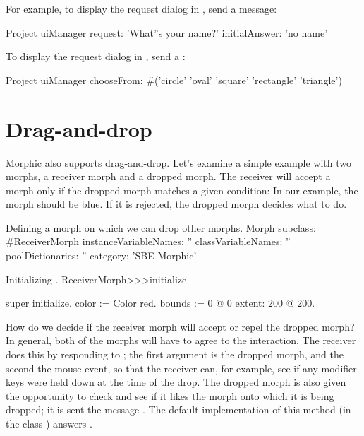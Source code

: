 \documentclass[a4paper,10pt,twoside]{book}
\begin{document}
For example, to display the request dialog in , send a  message:
\begin{code}{}
Project uiManager
	request: 'What''s your name?'
	initialAnswer: 'no name'
\end{code}

To display the request dialog in , send a :
\begin{code}{}
Project uiManager 
	chooseFrom: #('circle' 'oval' 'square' 'rectangle' 'triangle')
\end{code}

\section{Drag-and-drop}

Morphic also supports drag-and-drop.
Let's examine a simple example with two morphs, a receiver morph and a dropped morph. 
The receiver will accept a morph only if the dropped morph matches a given condition:
In our example, the morph should be blue.
If it is rejected, the dropped morph decides what to do.

\begin{classdef}{Defining a morph on which we can drop other morphs.}
Morph subclass: #ReceiverMorph
	instanceVariableNames: ''
	classVariableNames: ''
	poolDictionaries: ''
	category: 'SBE-Morphic'
\end{classdef}

\begin{method}{Initializing .}
ReceiverMorph>>>initialize

	super initialize.
	color := Color red.
	bounds := 0 @ 0 extent: 200 @ 200.
\end{method}

How do we decide if the receiver morph will accept or repel the dropped morph?
In general, both of the morphs will have to agree to the interaction.
The receiver does this by responding to ; the first argument is the dropped morph, and the second the mouse event, so that the receiver can, for example, see if any modifier keys were held down at the time of the drop. 
The dropped morph is also given the opportunity to check and see if it likes the morph onto which it is being dropped; it is sent the message .
The default implementation of this method (in the class ) answers .
\end{document}
